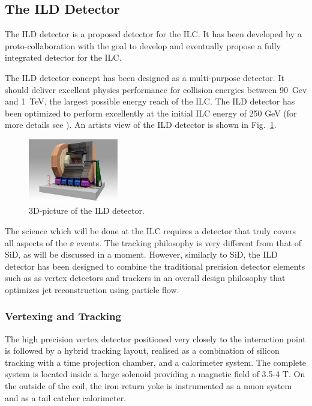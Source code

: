 \subsection{The ILD Detector}
The ILD detector is a proposed detector for the ILC. It has been developed by a proto-collaboration with the goal to develop and eventually propose a fully integrated detector for the ILC. 

The ILD detector concept has been designed as a multi-purpose detector. It should deliver excellent physics performance for collision energies between 90~Gev and 1~TeV, the largest possible energy reach of the ILC. The ILD detector has been optimized to perform excellently at the initial ILC energy of 250 GeV (for more details see \cite{ild:bib:ILDloi,ild:bib:ILDDBD}). An artists view of the ILD detector is shown in Fig.~\ref{fig:ild_3d}. 
\begin{figure}
    \centering
    \includegraphics[width=0.35\textwidth]{../figures/ILD.pdf}
    \caption{3D-picture of the ILD detector.}
    \label{fig:ild_3d}
\end{figure}

The science which will be done at the ILC requires a detector that
truly covers all aspects of the $\ee$ events.  The tracking philosophy
is very different from that of SiD, as will be discussed in a moment.
However, similarly to SiD, the ILD detector has been designed to combine the traditional
precision detector 
elements such as as vertex detectors and trackers in an overall design
philosophy 
that optimizes jet reconstruction using particle flow. 


\subsubsection{Vertexing and Tracking}
\label{subsubsec:ILDtracker}
The high precision vertex detector positioned very closely to the
interaction point is followed by a hybrid tracking layout, realised as
a combination of silicon tracking with a time projection chamber, and
a calorimeter system. The complete system is located inside a large
solenoid providing a magnetic field of 3.5-4 T. On the outside of the
coil, 
the iron return yoke is instrumented as a muon system and as a tail catcher calorimeter. 

